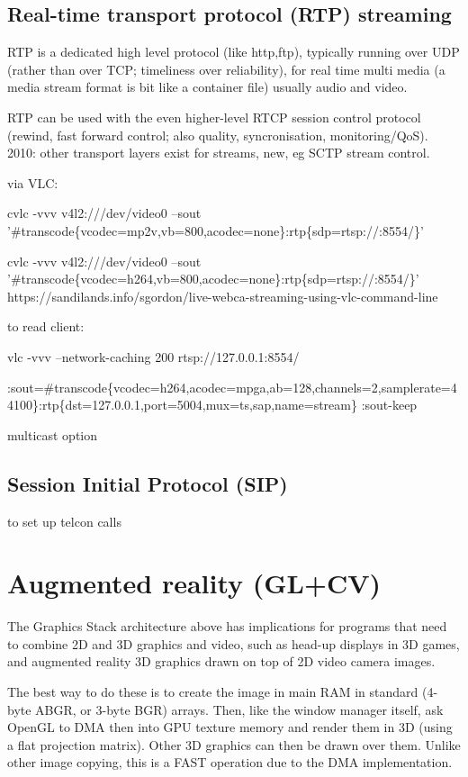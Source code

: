 \documentclass[oneside,english]{scrbook}
\begin{document}
\section{Real-time transport protocol (RTP) streaming}

RTP is a dedicated high level protocol (like http,ftp), typically running over UDP (rather than over TCP; timeliness over reliability), for real time multi media (a media stream format is bit like a container file) usually audio and video.

RTP can be used with the even higher-level RTCP session control protocol (rewind, fast forward control; also quality, syncronisation, monitoring/QoS).   2010: other transport layers exist for streams, new, eg SCTP stream control.

via VLC: 

cvlc -vvv v4l2:///dev/video0 --sout '\#transcode\{vcodec=mp2v,vb=800,acodec=none\}:rtp\{sdp=rtsp://:8554/\}' 

cvlc -vvv v4l2:///dev/video0 --sout '\#transcode\{vcodec=h264,vb=800,acodec=none\}:rtp\{sdp=rtsp://:8554/\}'
https://sandilands.info/sgordon/live-webca-streaming-using-vlc-command-line

to read client: 

vlc -vvv --network-caching 200 rtsp://127.0.0.1:8554/

:sout=\#transcode\{vcodec=h264,acodec=mpga,ab=128,channels=2,samplerate=44100\}:rtp\{dst=127.0.0.1,port=5004,mux=ts,sap,name=stream\}
:sout-keep

multicast option


\section{Session Initial Protocol (SIP)}

to set up telcon calls


\chapter{Augmented reality (GL+CV)}

The Graphics Stack architecture above has implications for programs that need to combine 2D and 3D graphics and video, such as head-up displays in 3D games, and augmented reality 3D graphics drawn on top of 2D video camera images.

The best way to do these is to create the image in main RAM in standard (4-byte ABGR, or 3-byte BGR) arrays. Then, like the window manager itself, ask OpenGL to DMA then into GPU texture memory and render them in 3D (using a flat projection matrix). Other 3D graphics can then be drawn over them.  Unlike other image copying, this is a FAST operation due to the DMA implementation.
\end{document}
